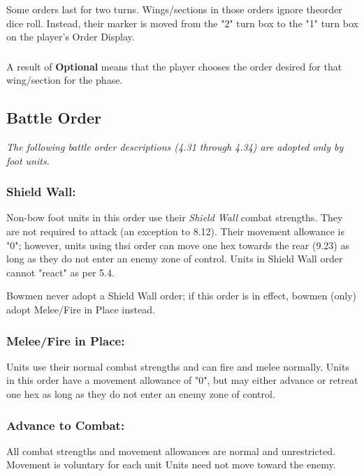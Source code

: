 \subsubsection[Order Length]{}

Some orders last for two turns. Wings/sections in those orders ignore theorder dice roll. Instead, their marker is moved from the "2" turn box to the "1" turn box on the player's Order Display.

\subsubsection[Optional Order]{}

A result of \textbf{Optional} means that the player chooses the order desired for that wing/section for the phase.

\subsection{Battle Order}

\textit{The following battle order descriptions (4.31 through 4.34) are adopted only by foot units.}

\subsubsection{Shield Wall:} Non-bow foot units in this order use their \textit{Shield Wall} combat strengths. They are not required to attack (an exception to 8.12). Their movement allowance is "0"; however, units using thsi order can move one hex towards the rear (9.23) as long as they do not enter an enemy zone of control. Units in Shield Wall order cannot "react" as per 5.4.

Bowmen never adopt a Shield Wall order; if this order is in effect, bowmen (only) adopt Melee/Fire in Place instead.

\subsubsection{Melee/Fire in Place:} Units use their normal combat strengths and can fire and melee normally. Units in this order have a movement allowance of "0", but may either advance or retreat one hex as long as they do not enter an enemy zone of control.

\subsubsection{Advance to Combat:} All combat strengths and movement allowances are normal and unrestricted. Movement is voluntary for each unit Units need not move toward the enemy.


